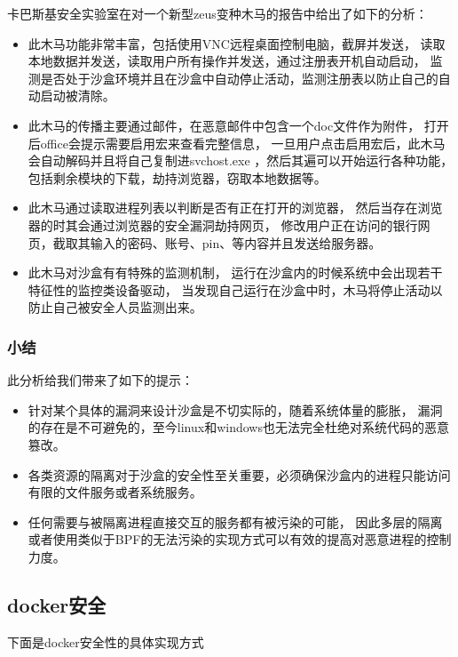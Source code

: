 \documentclass[AutoFakeBold,a4paper]{ctexart}
\begin{document}
卡巴斯基安全实验室在对一个新型zeus变种木马的报告中给出了如下的分析：\cite{ZeuS2018}

\begin{itemize}
    \item 此木马功能非常丰富，包括使用VNC远程桌面控制电脑，截屏并发送，
    读取本地数据并发送，读取用户所有操作并发送，通过注册表开机自动启动，
    监测是否处于沙盒环境并且在沙盒中自动停止活动，监测注册表以防止自己的自动启动被清除。

    \item 此木马的传播主要通过邮件，在恶意邮件中包含一个doc文件作为附件，
    打开后office会提示需要启用宏来查看完整信息，
    一旦用户点击启用宏后，此木马会自动解码并且将自己复制进svchost.exe
    ，然后其遍可以开始运行各种功能，包括剩余模块的下载，劫持浏览器，窃取本地数据等。
    
    \item 此木马通过读取进程列表以判断是否有正在打开的浏览器，
    然后当存在浏览器的时其会通过浏览器的安全漏洞劫持网页，
    修改用户正在访问的银行网页，截取其输入的密码、账号、pin、等内容并且发送给服务器。
    
    \item 此木马对沙盒有有特殊的监测机制，
    运行在沙盒内的时候系统中会出现若干特征性的监控类设备驱动，
    当发现自己运行在沙盒中时，木马将停止活动以防止自己被安全人员监测出来。
\end{itemize}

\subsubsection{小结}

此分析给我们带来了如下的提示：
\begin{itemize}
    \item 针对某个具体的漏洞来设计沙盒是不切实际的，随着系统体量的膨胀，
    漏洞的存在是不可避免的，至今linux和windows也无法完全杜绝对系统代码的恶意篡改。
    \item 各类资源的隔离对于沙盒的安全性至关重要，必须确保沙盒内的进程只能访问有限的文件服务或者系统服务。
    \item 任何需要与被隔离进程直接交互的服务都有被污染的可能，
    因此多层的隔离或者使用类似于BPF的无法污染的实现方式可以有效的提高对恶意进程的控制力度。
\end{itemize}


\subsection{docker安全}
下面是docker安全性的具体实现方式\cite{boettiger2015introduction} \cite{rad2017introduction}
\end{document}
